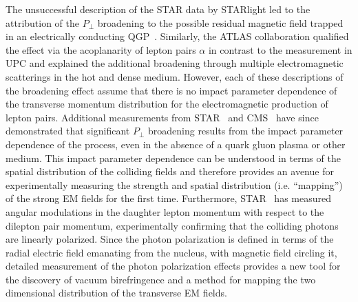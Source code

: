 \documentclass[twocolumn,epjc3]{svjour3}\sloppy
\begin{document}
The unsuccessful description of the STAR data by STARlight led to the attribution of the $P_\perp$ broadening to the possible residual magnetic field trapped in an electrically conducting QGP~\cite{mclerranCommentsElectromagneticField2014}. 
Similarly, the ATLAS collaboration qualified the effect via the acoplanarity of lepton pairs $\alpha$ in contrast to the measurement in UPC and explained the additional broadening through multiple electromagnetic scatterings in the hot and dense medium. 
However, each of these descriptions of the broadening effect assume that there is no impact parameter dependence of the transverse momentum distribution for the electromagnetic production of lepton pairs.
Additional measurements from STAR~\cite{starcollaborationMeasurementMomentumAngular2021} and CMS~\cite{cmscollaborationObservationForwardNeutron2020a} have since demonstrated that significant $P_\perp$ broadening results from the impact parameter dependence of the process, even in the absence of a quark gluon plasma or other medium. 
This impact parameter dependence can be understood in terms of the spatial distribution of the colliding fields and therefore provides an avenue for experimentally measuring the strength and spatial distribution (i.e. ``mapping'') of the strong EM fields for the first time.
Furthermore, STAR~\cite{starcollaborationMeasurementMomentumAngular2021} has measured angular modulations in the daughter lepton momentum with respect to the dilepton pair momentum, experimentally confirming that the colliding photons are linearly polarized.
Since the photon polarization is defined in terms of the radial electric field emanating from the nucleus, with magnetic field circling it, detailed measurement of the photon polarization effects provides a new tool for the discovery of vacuum birefringence and a method for mapping the two dimensional distribution of the transverse EM fields.
\end{document}
